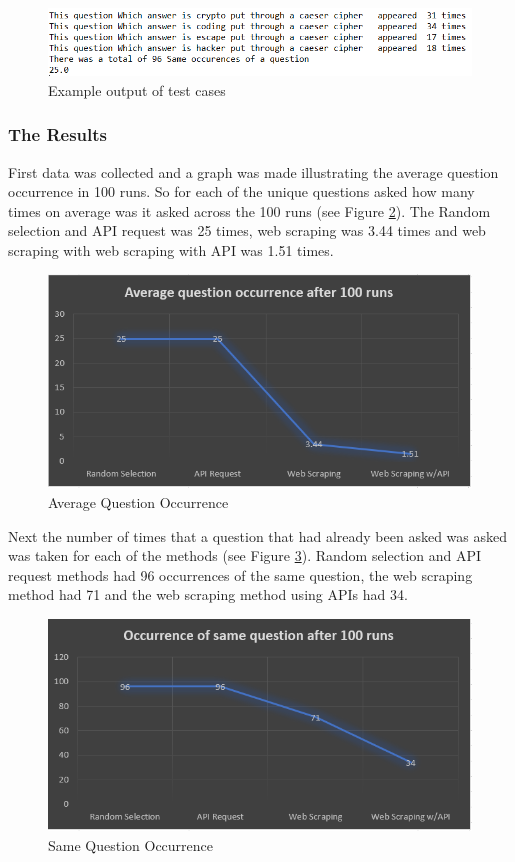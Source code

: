 \documentclass[12pt,a4paper]{article}
\begin{document}
\begin{figure}[!ht]
    \centering
    \includegraphics[width=1.0\textwidth]{Figs/exampleoutput1.PNG} 
    \caption{Example output of test cases} 
    \label{exout1}
\end{figure}  

\subsubsection{The Results} 
First data was collected and a graph was made illustrating the average question occurrence in 100 runs. So for each of the unique questions asked how many times on average was it asked across the 100 runs (see Figure \ref{r1}). The Random selection and API request was 25 times, web scraping was 3.44 times and web scraping with web scraping with API was 1.51 times.

\begin{figure}[!ht]
    \centering
    \includegraphics[width=1.0\textwidth]{Figs/results1.PNG} 
    \caption{Average Question Occurrence} 
    \label{r1}
\end{figure} 

Next the number of times that a question that had already been asked was asked was taken for each of the methods (see Figure \ref{r2}). Random selection and API request methods had 96 occurrences of the same question, the web scraping method had 71 and the web scraping method using APIs had 34.

\begin{figure}[!ht]
    \centering
    \includegraphics[width=1.0\textwidth]{Figs/results2.PNG} 
    \caption{Same Question Occurrence} 
    \label{r2}
\end{figure}  
\end{document}
